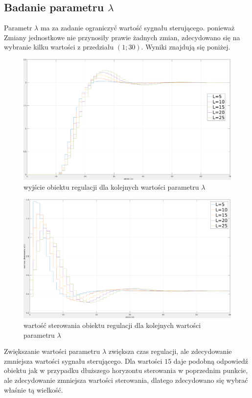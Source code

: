 \documentclass[fleqn]{article}
\begin{document}
\subsection{Badanie parametru $\lambda$}

	Parametr $\lambda$ ma za zadanie ograniczyć wartość sygnału sterującego. ponieważ  Zmiany jednostkowe nie przynosiły prawie żadnych zmian, zdecydowano się na wybranie kilku wartości z przedziału $(1;30)$. Wyniki znajdują się poniżej.

	\begin{figure}[H]
		\includegraphics[width=\textwidth]{scripts/zadanie5dwyjscie.png}
		\caption{wyjście obiektu regulacji dla kolejnych wartości parametru $\lambda$}
	\end{figure}
	\begin{figure}[H]
		\includegraphics[width=\textwidth]{scripts/zadanie5dster.png}
		\caption{wartość sterowania obiektu regulacji dla kolejnych wartości parametru $\lambda$}
	\end{figure}

	Zwiększanie wartości parametru $\lambda$ zwiększa czas regulacji, ale zdecydowanie zmniejsza wartości sygnału sterującego. Dla wartości $15$ daje podobną odpowiedź obiektu jak w przypadku dłuższego horyzontu sterowania w poprzednim punkcie, ale zdecydowanie zmniejsza wartości sterowania, dlatego zdecydowano się wybrać właśnie tą wielkość.
\end{document}
